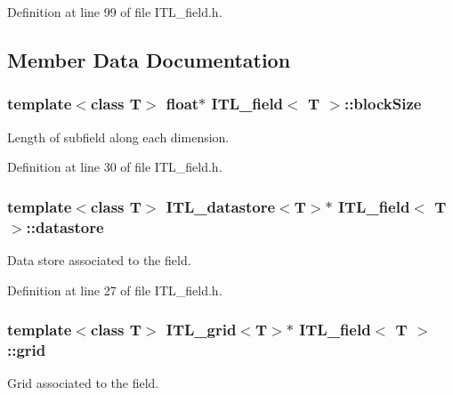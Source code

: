 Definition at line 99 of file ITL\_\-field.h.



\subsection{Member Data Documentation}
\hypertarget{classITL__field_a705d31afd5f130e8d977a0b7aab68fec}{
\subsubsection[{blockSize}]{\setlength{\rightskip}{0pt plus 5cm}template$<$class T$>$ float$\ast$ {\bf ITL\_\-field}$<$ T $>$::{\bf blockSize}}}
\label{classITL__field_a705d31afd5f130e8d977a0b7aab68fec}


Length of subfield along each dimension. 



Definition at line 30 of file ITL\_\-field.h.

\hypertarget{classITL__field_aab9c6cdf9f4a7f3cd338e92c1dad9931}{
\subsubsection[{datastore}]{\setlength{\rightskip}{0pt plus 5cm}template$<$class T$>$ {\bf ITL\_\-datastore}$<$T$>$$\ast$ {\bf ITL\_\-field}$<$ T $>$::{\bf datastore}}}
\label{classITL__field_aab9c6cdf9f4a7f3cd338e92c1dad9931}


Data store associated to the field. 



Definition at line 27 of file ITL\_\-field.h.

\hypertarget{classITL__field_a6c1bd62b59c41067f23f70ee2dc8a25a}{
\subsubsection[{grid}]{\setlength{\rightskip}{0pt plus 5cm}template$<$class T$>$ {\bf ITL\_\-grid}$<$T$>$$\ast$ {\bf ITL\_\-field}$<$ T $>$::{\bf grid}}}
\label{classITL__field_a6c1bd62b59c41067f23f70ee2dc8a25a}


Grid associated to the field. 



